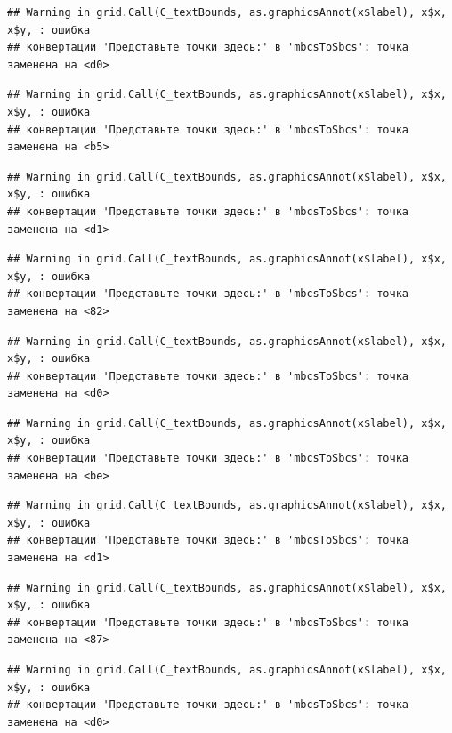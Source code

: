 \documentclass[]{book}
\begin{document}
\begin{verbatim}
## Warning in grid.Call(C_textBounds, as.graphicsAnnot(x$label), x$x, x$y, : ошибка
## конвертации 'Представьте точки здесь:' в 'mbcsToSbcs': точка заменена на <d0>
\end{verbatim}

\begin{verbatim}
## Warning in grid.Call(C_textBounds, as.graphicsAnnot(x$label), x$x, x$y, : ошибка
## конвертации 'Представьте точки здесь:' в 'mbcsToSbcs': точка заменена на <b5>
\end{verbatim}

\begin{verbatim}
## Warning in grid.Call(C_textBounds, as.graphicsAnnot(x$label), x$x, x$y, : ошибка
## конвертации 'Представьте точки здесь:' в 'mbcsToSbcs': точка заменена на <d1>
\end{verbatim}

\begin{verbatim}
## Warning in grid.Call(C_textBounds, as.graphicsAnnot(x$label), x$x, x$y, : ошибка
## конвертации 'Представьте точки здесь:' в 'mbcsToSbcs': точка заменена на <82>
\end{verbatim}

\begin{verbatim}
## Warning in grid.Call(C_textBounds, as.graphicsAnnot(x$label), x$x, x$y, : ошибка
## конвертации 'Представьте точки здесь:' в 'mbcsToSbcs': точка заменена на <d0>
\end{verbatim}

\begin{verbatim}
## Warning in grid.Call(C_textBounds, as.graphicsAnnot(x$label), x$x, x$y, : ошибка
## конвертации 'Представьте точки здесь:' в 'mbcsToSbcs': точка заменена на <be>
\end{verbatim}

\begin{verbatim}
## Warning in grid.Call(C_textBounds, as.graphicsAnnot(x$label), x$x, x$y, : ошибка
## конвертации 'Представьте точки здесь:' в 'mbcsToSbcs': точка заменена на <d1>
\end{verbatim}

\begin{verbatim}
## Warning in grid.Call(C_textBounds, as.graphicsAnnot(x$label), x$x, x$y, : ошибка
## конвертации 'Представьте точки здесь:' в 'mbcsToSbcs': точка заменена на <87>
\end{verbatim}

\begin{verbatim}
## Warning in grid.Call(C_textBounds, as.graphicsAnnot(x$label), x$x, x$y, : ошибка
## конвертации 'Представьте точки здесь:' в 'mbcsToSbcs': точка заменена на <d0>
\end{verbatim}
\end{document}
